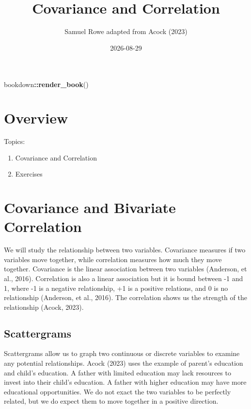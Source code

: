 \documentclass[
]{book}
\title{Covariance and Correlation}
\author{Samuel Rowe adapted from Acock (2023)}
\date{2026-08-29}
\newenvironment{Shaded}{\begin{snugshade}}{\end{snugshade}}
\newcommand{\FunctionTok}[1]{\textcolor[rgb]{0.13,0.29,0.53}{\textbf{#1}}}
\newcommand{\NormalTok}[1]{#1}
\newcommand{\SpecialCharTok}[1]{\textcolor[rgb]{0.81,0.36,0.00}{\textbf{#1}}}
\providecommand{\tightlist}{%
  \setlength{\itemsep}{0pt}\setlength{\parskip}{0pt}}
\begin{document}
\maketitle

{
\setcounter{tocdepth}{1}
\tableofcontents
}
\begin{Shaded}
\begin{Highlighting}[]
\NormalTok{bookdown}\SpecialCharTok{::}\FunctionTok{render\_book}\NormalTok{()}
\end{Highlighting}
\end{Shaded}

\chapter*{Overview}\label{overview}

Topics:

\begin{enumerate}
\def\labelenumi{\arabic{enumi}.}
\tightlist
\item
  Covariance and Correlation
\item
  Exercises
\end{enumerate}

\chapter{Covariance and Bivariate Correlation}\label{covariance-and-bivariate-correlation}

We will study the relationship between two variables. Covariance measures if two variables move together, while correlation measures how much they move together. Covariance is the linear association between two variables (Anderson, et al., 2016). Correlation is also a linear association but it is bound between -1 and 1, where -1 is a negative relationship, +1 is a positive relations, and 0 is no relationship (Anderson, et al., 2016). The correlation shows us the strength of the relationship (Acock, 2023).

\section{Scattergrams}\label{scattergrams}

Scattergrams allow us to graph two continuous or discrete variables to examine any potential relationships. Acock (2023) uses the example of parent's education and child's education. A father with limited education may lack resources to invest into their child's education. A father with higher education may have more educational opportunities. We do not exact the two variables to be perfectly related, but we do expect them to move together in a positive direction.
\end{document}
